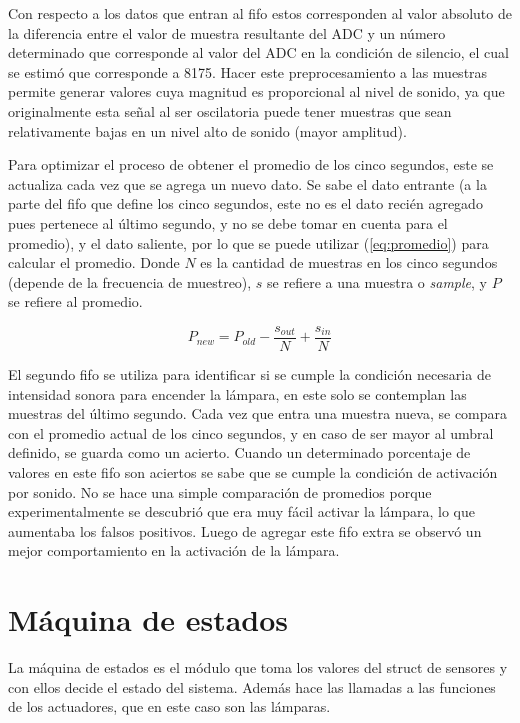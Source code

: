 Con respecto a los datos que entran al fifo estos corresponden al valor absoluto de la diferencia
entre el valor de muestra resultante del ADC y un número determinado que corresponde al valor del
ADC en la condición de silencio, el cual se estimó que corresponde a 8175. Hacer este
preprocesamiento a las muestras permite generar valores cuya magnitud es proporcional al nivel de
sonido, ya que originalmente esta señal al ser oscilatoria puede tener muestras que sean
relativamente bajas en un nivel alto de sonido (mayor amplitud).  

Para optimizar el proceso de obtener el promedio de los cinco segundos, este se
actualiza cada vez que se agrega un nuevo dato. Se sabe el dato entrante (a la parte del fifo que
define los cinco segundos, este no es el dato recién agregado pues pertenece al último segundo, y
no se debe tomar en cuenta para el promedio), y el dato saliente, por lo que se puede utilizar
(\ref{eq:promedio}) para calcular el promedio. Donde $N$ es la cantidad de muestras en los cinco
segundos (depende de la frecuencia de muestreo), $s$ se refiere a una muestra o \textit{sample}, y
$P$ se refiere al promedio.

\begin{equation}
  P_{new} = P_{old}-\frac{s_{out}}{N}+\frac{s_{in}}{N}
\end{equation}

El segundo fifo se utiliza para identificar si se cumple la condición necesaria de intensidad sonora
para encender la lámpara, en este solo se contemplan las muestras del último segundo.  Cada vez que
entra una muestra nueva, se compara con el promedio actual de los cinco segundos, y en caso de ser
mayor al umbral definido, se guarda como un acierto. Cuando un determinado porcentaje de valores en
este fifo son aciertos se sabe que se cumple la condición de activación por sonido. No se
hace una simple comparación de promedios porque experimentalmente se descubrió que era muy fácil
activar la lámpara, lo que aumentaba los falsos positivos. Luego de agregar este fifo extra se
observó un mejor comportamiento en la activación de la lámpara.

\section{Máquina de estados}

La máquina de estados es el módulo que toma los valores del struct de sensores y con ellos decide el
estado del sistema. Además hace las llamadas a las funciones de los actuadores, que en este caso son
las lámparas. 

